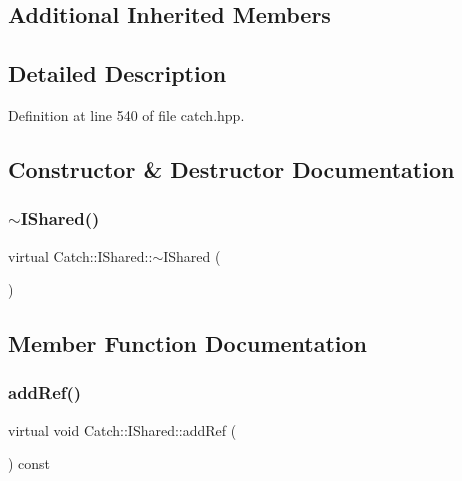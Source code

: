 \subsection*{Additional Inherited Members}


\subsection{Detailed Description}


Definition at line 540 of file catch.\+hpp.



\subsection{Constructor \& Destructor Documentation}
\hypertarget{struct_catch_1_1_i_shared_a5e842e7540ae7ae0c62a2758123503f6}{}\label{struct_catch_1_1_i_shared_a5e842e7540ae7ae0c62a2758123503f6} 
\subsubsection{\texorpdfstring{$\sim$\+I\+Shared()}{~IShared()}}
{\footnotesize\ttfamily virtual Catch\+::\+I\+Shared\+::$\sim$\+I\+Shared (\begin{DoxyParamCaption}{ }\end{DoxyParamCaption})\hspace{0.3cm}{\ttfamily [virtual]}}



\subsection{Member Function Documentation}
\hypertarget{struct_catch_1_1_i_shared_ae383df68557cdaf0910b411af04d9e33}{}\label{struct_catch_1_1_i_shared_ae383df68557cdaf0910b411af04d9e33} 
\subsubsection{\texorpdfstring{add\+Ref()}{addRef()}}
{\footnotesize\ttfamily virtual void Catch\+::\+I\+Shared\+::add\+Ref (\begin{DoxyParamCaption}{ }\end{DoxyParamCaption}) const\hspace{0.3cm}{\ttfamily [pure virtual]}}




